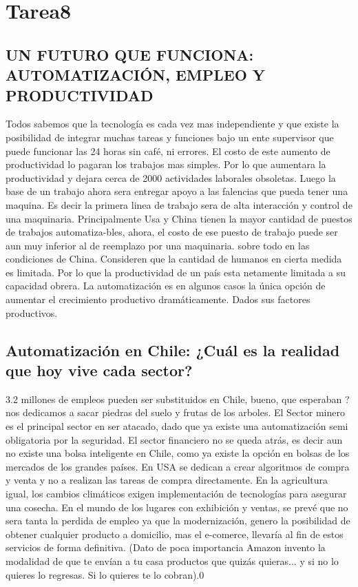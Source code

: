 \newpage

\section{Tarea8}

\subsection{UN FUTURO QUE FUNCIONA: AUTOMATIZACIÓN, EMPLEO Y PRODUCTIVIDAD 
}
Todos sabemos que la tecnología es cada vez mas independiente y que existe la posibilidad de integrar muchas tareas y funciones bajo un ente supervisor que puede funcionar las 24 horas sin café, ni errores.  
El costo de este aumento de productividad lo pagaran los trabajos mas simples. Por lo que aumentara la productividad y dejara cerca de 2000 actividades laborales obsoletas. Luego la base de un trabajo ahora sera entregar apoyo a las falencias que pueda tener una maquina. Es decir la primera linea de trabajo sera de alta interacción y control de una maquinaria.  
Principalmente Usa y China tienen la mayor cantidad de puestos de trabajos automatiza-bles, ahora, el costo de ese puesto de trabajo puede ser aun muy inferior al de reemplazo por una maquinaria. sobre todo en las condiciones de China.
\bigskip 
Consideren que la cantidad de humanos en cierta medida es limitada. Por lo que la productividad de un país esta netamente limitada a su capacidad obrera. La automatización es en algunos casos la única opción de aumentar el crecimiento productivo dramáticamente. Dados sus factores productivos. 

\subsection{Automatización en Chile: ¿Cuál es la realidad que hoy vive cada sector?}

3.2 millones de empleos pueden ser substituidos en Chile, bueno, que esperaban ? nos dedicamos a sacar piedras del suelo y frutas de los arboles. 
El Sector minero es el principal sector en ser atacado, dado que ya existe una automatización semi obligatoria por la seguridad.
\smallskip 
El sector financiero no se queda atrás, es decir aun no existe una bolsa inteligente en Chile, como ya existe la opción en bolsas de los mercados de los grandes países. En USA se dedican a crear algoritmos de compra y venta y no a realizan las tareas de compra directamente. 
En la agricultura igual, los cambios climáticos exigen implementación de tecnologías para asegurar una cosecha. 
En el mundo de los lugares con exhibición y ventas, se prevé que no sera tanta la perdida de empleo ya que la modernización, genero la posibilidad de obtener cualquier producto a domicilio, mas el e-comerce, llevaría al fin de estos servicios de forma definitiva. (Dato de poca importancia Amazon invento la modalidad de que te envían a tu  casa productos que quizás quieras... y si no lo quieres lo regresas. Si lo quieres te lo cobran).0

